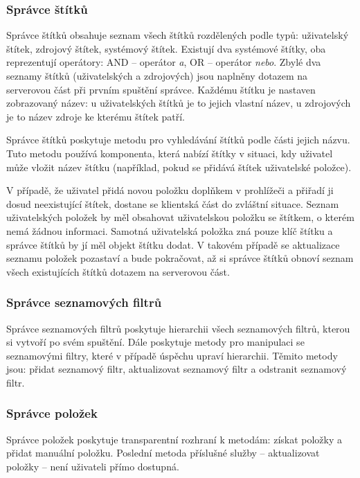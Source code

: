 \subsubsection{Správce štítků}

Správce štítků obsahuje seznam všech štítků rozdělených podle typů: uživatelský štítek, zdrojový štítek, systémový štítek.
Existují dva systémové štítky, oba reprezentují operátory: AND -- operátor \textit{a}, OR -- operátor \textit{nebo}.
Zbylé dva seznamy štítků (uživatelských a zdrojových) jsou naplněny dotazem na serverovou část při prvním spuštění správce.
Každému štítku je nastaven zobrazovaný název: u uživatelských štítků je to jejich vlastní název, u zdrojových je to název zdroje ke kterému štítek patří.

Správce štítků poskytuje metodu pro vyhledávání štítků podle části jejich názvu.
Tuto metodu používá komponenta, která nabízí štítky v situaci, kdy uživatel může vložit název štítku (například, pokud se přidává štítek uživatelské položce).

V případě, že uživatel přidá novou položku doplňkem v prohlížeči a přiřadí ji dosud neexistující štítek, dostane se klientská část do zvláštní situace.
Seznam uživatelských položek by měl obsahovat uživatelskou položku se štítkem, o kterém nemá žádnou informaci.
Samotná uživatelská položka zná pouze klíč štítku a správce štítků by jí měl objekt štítku dodat.
V takovém případě se aktualizace seznamu položek pozastaví a bude pokračovat, až si správce štítků obnoví seznam všech existujících štítků dotazem na serverovou část.

\subsubsection{Správce seznamových filtrů}

Správce seznamových filtrů poskytuje hierarchii všech seznamových filtrů, kterou si vytvoří po svém spuštění.
Dále poskytuje metody pro manipulaci se seznamovými filtry, které v případě úspěchu upraví hierarchii.
Těmito metody jsou: přidat seznamový filtr, aktualizovat seznamový filtr a odstranit seznamový filtr.

\subsubsection{Správce položek}

Správce položek poskytuje transparentní rozhraní k metodám: získat položky a přidat manuální položku.
Poslední metoda příslušné služby -- aktualizovat položky -- není uživateli přímo dostupná.

